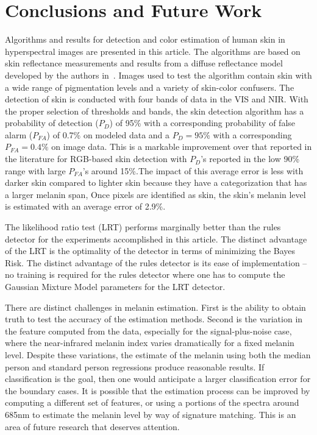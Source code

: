 \documentclass[10pt,journal,cspaper,compsoc]{IEEEtran}
\begin{document}
\section{Conclusions and Future Work}
\label{scn:conclusions}
Algorithms and results for detection and color estimation of human skin in hyperspectral images are presented in this article.  The 
algorithms are based on skin reflectance measurements and results from a diffuse reflectance model developed by the authors 
in~\cite{Nunez8}. Images used to test the algorithm contain skin with a wide range of pigmentation levels and a variety of 
skin-color confusers.  The detection of skin is conducted with four bands of data in the VIS and NIR.  With the proper selection 
of thresholds and bands, the skin detection algorithm has a probability of detection ($P_D$) of 95\% with a 
corresponding probability of false alarm ($P_{FA}$) of 0.7\% on modeled data and a $P_D=95\%$ with a 
corresponding $P_{FA}=0.4\%$ on image data.  This is a markable improvement over that reported in the literature for 
RGB-based skin detection with $P_D$'s reported in the low 90\% range with large $P_{FA}$'s around 15\%.The impact of 
this average error is less with darker skin compared to lighter skin because they have a categorization that has a larger melanin 
span,
Once pixels are identified as skin, the skin's melanin level is estimated with an average error of 2.9\%.

The likelihood ratio test (LRT) performs marginally better than the rules detector for the experiments accomplished in this article.
The distinct advantage of the LRT is the optimality of the detector in terms of minimizing the Bayes Risk.  The distinct advantage 
of the rules detector is its ease of implementation -- no training is required for the rules detector where one 
has to compute the Gaussian Mixture Model parameters for the LRT detector.

There are distinct challenges in melanin estimation. First is the ability to obtain truth to test the accuracy of 
the estimation methods.  Second is the variation in the feature computed from the data, especially for the signal-plus-noise 
case, where the near-infrared melanin index varies dramatically for a fixed melanin level.  Despite these variations, 
the estimate of the melanin using both the median person and standard person regressions produce reasonable results.  If 
classification is the goal, then one would anticipate a larger classification error for the boundary cases.  It is possible 
that the estimation process 
can be improved by computing a different set of features, or using a portions of the spectra around 685nm to estimate the 
melanin level by way of signature matching.  This is an area of future research that deserves attention.
\end{document}
